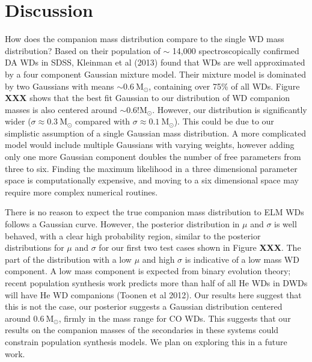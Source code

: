 \documentclass[letterpaper,12pt,preprint]{aastex}
\newcommand{\Msun}{\mathrm{M}_\odot}
\begin{document}
\section{Discussion}

How does the companion mass distribution compare to the single WD mass distribution? Based on their population of $\sim$ 14,000 spectroscopically confirmed DA WDs in SDSS, Kleinman et al (2013) found that WDs are well approximated by a four component Gaussian mixture model. Their mixture model is dominated by two Gaussians with means $\sim0.6~\Msun$, containing over 75\% of all WDs. Figure {\bf XXX} shows that the best fit Gaussian to our distribution of WD companion masses is also centered around $\sim0.6!\Msun$. However, our distribution is significantly wider ($\sigma \approx 0.3~\Msun$ compared with $\sigma \approx 0.1~\Msun$). This could be due to our simplistic assumption of a single Gaussian mass distribution. A more complicated model would include multiple Gaussians with varying weights, however adding only one more Gaussian component doubles the number of free parameters from three to six. Finding the maximum likelihood in a three dimensional parameter space is computationally expensive, and moving to a six dimensional space may require more complex numerical routines. 


There is no reason to expect the true companion mass distribution to ELM WDs follows a Gaussian curve. However, the posterior distribution in $\mu$ and $\sigma$ is well behaved, with a clear high probability region, similar to the posterior distributions for $\mu$ and $\sigma$ for our first two test cases shown in Figure {\bf XXX}. The part of the distribution with a low $\mu$ and high $\sigma$ is indicative of a low mass WD component. A low mass component is expected from binary evolution theory; recent population synthesis work predicts more than half of all He WDs in DWDs will have He WD companions (Toonen et al 2012). Our results here suggest that this is not the case, our posterior suggests a Gaussian distribution centered around $0.6~\Msun$, firmly in the mass range for CO WDs. This suggests that our results on the companion masses of the secondaries in these systems could constrain population synthesis models. We plan on exploring this in a future work.
\end{document}
